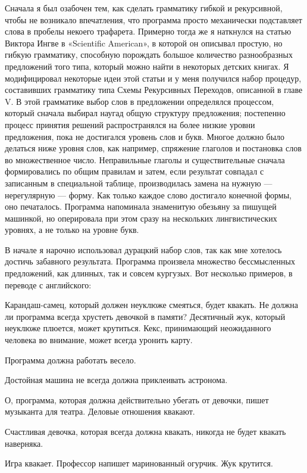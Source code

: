 \documentclass[../main.tex]{subfiles}
\begin{document}
Сначала я был озабочен тем, как сделать грамматику гибкой и рекурсивной, чтобы не возникало впечатления, что программа просто механически подставляет слова в пробелы некоего трафарета. Примерно тогда же я наткнулся на статью Виктора Ингве в «Scientific American», в которой он описывал простую, но гибкую грамматику, способную порождать большое количество разнообразных предложений того типа, который можно найти в некоторых детских книгах. Я модифицировал некоторые идеи этой статьи и у меня получился набор процедур, составивших грамматику типа Схемы Рекурсивных Переходов, описанной в главе V. В этой грамматике выбор слов в предложении определялся процессом, который сначала выбирал наугад общую структуру предложения; постепенно процесс принятия решений распространялся на более низкие уровни предложения, пока не достигался уровень слов и букв. Многое должно было делаться ниже уровня слов, как например, спряжение глаголов и постановка слов во множественное число. Неправильные глаголы и существительные сначала формировались по общим правилам и затем, если результат совпадал с записанным в специальной таблице, производилась замена на нужную --- нерегулярную --- форму. Как только каждое слово достигало конечной формы, оно печаталось. Программа напоминала знаменитую обезьяну за пишущей машинкой, но оперировала при этом сразу на нескольких лингвистических уровнях, а не только на уровне букв.

В начале я нарочно использовал дурацкий набор слов, так как мне хотелось достичь забавного результата. Программа произвела множество бессмысленных предложений, как длинных, так и совсем кургузых. Вот несколько примеров, в переводе с английского:

Карандаш-самец, который должен неуклюже смеяться, будет квакать. Не должна ли программа всегда хрустеть девочкой в памяти? Десятичный жук, который неуклюже плюется, может крутиться. Кекс, принимающий неожиданного человека во внимание, может всегда уронить карту.

Программа должна работать весело.

Достойная машина не всегда должна приклеивать астронома.

О, программа, которая должна действительно убегать от девочки, пишет музыканта для театра. Деловые отношения квакают.

Счастливая девочка, которая всегда должна квакать, никогда не будет квакать наверняка.

Игра квакает. Профессор напишет маринованный огурчик. Жук крутится.
\end{document}
